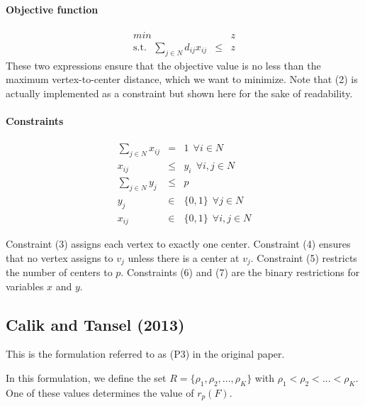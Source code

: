 \documentclass[a4paper,10pt]{article}
\begin{document}
	
	\paragraph{Objective function}
	\begin{eqnarray}
		min && z\\
		\text{s.t.}~~~ \sum_{j \in N} d_{ij} x_{ij} &\leq& z 
	\end{eqnarray}
	These two expressions ensure that the objective value is no less than the maximum vertex-to-center distance, which we want to minimize. Note that (2) is actually implemented as a constraint but shown here for the sake of readability.
	
	\paragraph{Constraints}
	\begin{eqnarray}
		\sum_{j \in N} x_{ij} &=& 1 ~~\forall i \in N \\
		x_{ij} &\leq& y_i ~~\forall i,j \in N \\
		\sum_{j \in N} y_j &\leq& p \\
		y_j &\in& \{ 0,1 \} ~~\forall j \in N \\
		x_{ij} &\in& \{0 , 1 \} ~~\forall i,j \in N 
	\end{eqnarray}
	
	Constraint (3) assigns each vertex to exactly one center.
	Constraint (4) ensures that no vertex assigns to $v_j$ unless there is a center at $v_j$. 
	Constraint (5) restricts the number of centers to $p$.
	Constraints (6) and (7) are the binary restrictions for variables $x$ and $y$.     
    
    \subsection{Calik and Tansel (2013)}
	This is the formulation referred to as (P3) in the original paper.
	
	In this formulation, we define the set $ R = \{ \rho_1, \rho_2, ..., \rho_K \}$ with $\rho_1 < \rho_2 < ... < \rho_K$. One of these values determines the value of $r_p(F)$.
\end{document}
